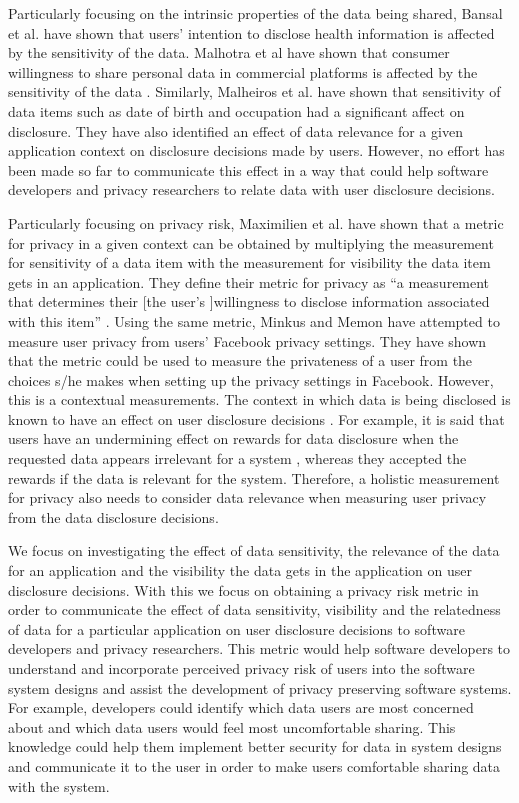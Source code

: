 \documentclass[conference]{IEEEtran}
\begin{document}
Particularly focusing on the intrinsic properties of the data being shared, Bansal et al. have shown that users' intention to disclose health information is affected by the sensitivity of the data\cite {bansal2010impact}. Malhotra et al have shown that consumer willingness to share personal data in commercial platforms is affected by the sensitivity of the data \cite {malhotra2004internet}. Similarly, Malheiros et al. \cite {malheiros2013fairly} have shown that sensitivity of data items such as date of birth and occupation had a significant affect on disclosure. They have also identified an effect of data relevance for a given application context on disclosure decisions made by users. However, no effort has been made so far to communicate this effect in a way that could help software developers and privacy researchers to relate data with user disclosure decisions.

Particularly focusing on privacy risk, Maximilien et al. \cite {maximilien2009privacy} have shown that a metric for privacy in a given context can be obtained by multiplying the measurement for sensitivity of a data item with the measurement for visibility the data item gets in an application. They define their metric for privacy as \enquote{a measurement that determines their [the user's ]willingness to disclose information associated with this item} \cite {maximilien2009privacy}. Using the same metric, Minkus and Memon \cite{minkus2014scale} have attempted to measure user privacy from users' Facebook privacy settings. They have shown that the metric could be used to measure the privateness of a user from the choices s/he makes when setting up the privacy settings in Facebook. However, this is a contextual measurements. The context in which data is being disclosed \cite {nissenbaum2009privacy, john2010strangers} is known to have an effect on user disclosure decisions \cite {knijnenburg2013making}. For example, it is said that users have an undermining effect on rewards for data disclosure when the requested data appears irrelevant for a system \cite {li2010understanding}, whereas they accepted the rewards if the data is relevant for the system. Therefore, a holistic measurement for privacy also needs to consider data relevance when measuring user privacy from the data disclosure decisions. 

We focus on investigating the effect of data sensitivity, the relevance of the data for an application and the visibility the data gets in the application on user disclosure decisions. With this we focus on obtaining a privacy risk metric in order to communicate the effect of data sensitivity, visibility and the relatedness of data for a particular application on user disclosure decisions to software developers and privacy researchers. This metric would help software developers to understand and incorporate perceived privacy risk of users into the software system designs and assist the development of privacy preserving software systems. For example, developers could identify which data users are most concerned about and which data users would feel most uncomfortable sharing. This knowledge could help them implement better security for data in system designs and communicate it to the user in order to make users comfortable sharing data with the system.
\end{document}
